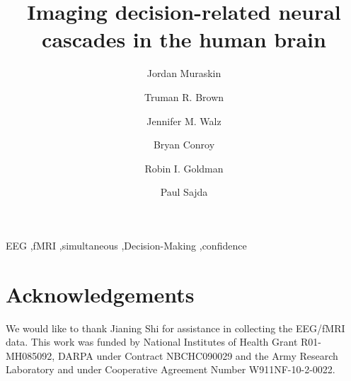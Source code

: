 \documentclass[preprint,12pt,3p]{elsarticle}
\begin{document}
\begin{frontmatter}

\title{Imaging decision-related neural cascades in the human brain}


\author[label1]{Jordan Muraskin}
\address[label1]{Department of Biomedical Engineering, Columbia University, New York, NY, USA 10027}

\author[label2]{Truman R. Brown}
\address[label2]{Center for Biomedical Imaging, Medical University of South Carolina, Charleston, SC, USA, 29425}

\author[label3]{Jennifer M. Walz}
\address[label3]{Florey Institute of Neuroscience and Mental Health, Melbourne, Australia}

\author[label4]{Bryan Conroy}
\address[label4]{Philips Research, Cambridge, MA USA, 02141}

\author[label5]{Robin I. Goldman}
\address[label5]{Center for Healthy Minds, University of Wisconsin-Madison, Madison, WI, USA, 53705}

\author[label1]{Paul Sajda}

\begin{abstract}

\end{abstract}

\begin{keyword}
EEG \sep fMRI \sep simultaneous \sep Decision-Making \sep confidence
\end{keyword}

\end{frontmatter}

\linenumbers







\section*{Acknowledgements}
We would like to thank Jianing Shi for assistance in collecting the EEG/fMRI data. This work was funded by National Institutes of Health Grant R01-MH085092, DARPA under Contract NBCHC090029 and the Army Research Laboratory and under Cooperative Agreement Number W911NF-10-2-0022.
\end{document}
